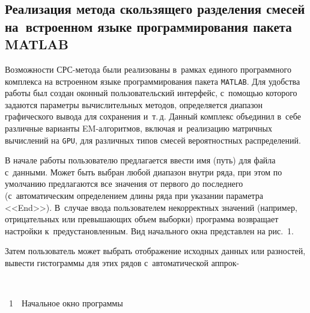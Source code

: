 \begin{multicols}{2}
\vspace*{-6pt}

\section{Реализация метода скользящего разделения смесей
на~встроенном языке программирования пакета MATLAB}

Возможности СРС-метода были реализованы в~рамках единого программного 
комплекса на встроенном языке программирования пакета \verb"MATLAB". 
Для удобства работы был создан оконный пользовательский интерфейс, 
с~по\-мощью которого задаются параметры вычислительных методов, определяется 
диапазон графического вывода для сохранения и~т.\,д. Данный комплекс 
объединил в~себе различные варианты EM-ал\-го\-рит\-мов, включая и~реализацию 
матричных вычислений на \verb"GPU", для различных типов смесей вероятностных 
распределений.



В начале работы пользователю предлагается ввес\-ти имя (путь) 
для файла с~данными. Может быть выбран любой диапазон внутри ряда, 
при этом по умолчанию предлагаются все значения от первого до последнего 
(с~автоматическим определением длины ряда при указании параметра <<{\sf End}>>). 
В~случае ввода пользователем некорректных значений (например, отрицательных или 
превышающих объем выборки) программа возвращает настройки к~предустановленным. 
Вид начального окна пред\-став\-лен на рис.~1.



Затем пользователь может выбрать отображение исходных данных или разностей, 
вывести гистограммы для этих рядов с~автоматической аппрок-\linebreak\vspace*{-12pt}

 \noindent
 \begin{center}  %
 \vspace*{9pt}
\mbox{%
 \epsfxsize=78mm
 }



\vspace*{3pt}

\noindent
{{\figurename~1}\ \ \small{Начальное окно программы}}
\end{center} 

 \noindent
 \begin{center}  %
 \vspace*{1pt}
\mbox{%
 \epsfxsize=78mm
 }




\end{center}
\end{multicols}
